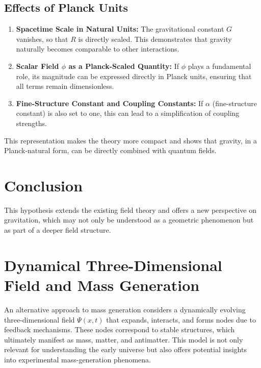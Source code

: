 \documentclass[a4paper,11pt]{article}
\begin{document}
	\subsection{Effects of Planck Units}
	\begin{enumerate}
		\item \textbf{Spacetime Scale in Natural Units:} The gravitational constant $G$ vanishes, so that $R$ is directly scaled. This demonstrates that gravity naturally becomes comparable to other interactions.
		\item \textbf{Scalar Field $\phi$ as a Planck-Scaled Quantity:} If $\phi$ plays a fundamental role, its magnitude can be expressed directly in Planck units, ensuring that all terms remain dimensionless.
		\item \textbf{Fine-Structure Constant and Coupling Constants:} If $\alpha$ (fine-structure constant) is also set to one, this can lead to a simplification of coupling strengths.
	\end{enumerate}
	This representation makes the theory more compact and shows that gravity, in a Planck-natural form, can be directly combined with quantum fields.
	
	\section{Conclusion}
	This hypothesis extends the existing field theory and offers a new perspective on gravitation, which may not only be understood as a geometric phenomenon but as part of a deeper field structure.
\section{Dynamical Three-Dimensional Field and Mass Generation}
An alternative approach to mass generation considers a dynamically evolving three-dimensional field $\Psi(x,t)$ that expands, interacts, and forms nodes due to feedback mechanisms. These nodes correspond to stable structures, which ultimately manifest as mass, matter, and antimatter. This model is not only relevant for understanding the early universe but also offers potential insights into experimental mass-generation phenomena.
\end{document}

